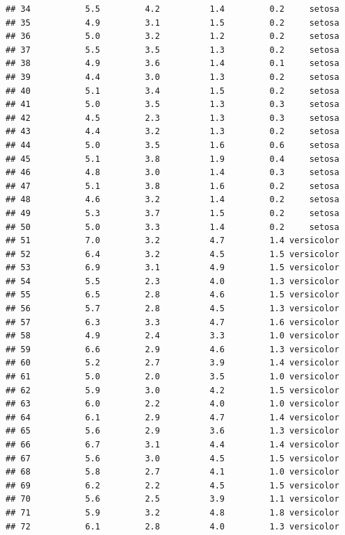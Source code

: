 \documentclass[
]{article}
\begin{document}
\begin{verbatim}
## 34           5.5         4.2          1.4         0.2     setosa
## 35           4.9         3.1          1.5         0.2     setosa
## 36           5.0         3.2          1.2         0.2     setosa
## 37           5.5         3.5          1.3         0.2     setosa
## 38           4.9         3.6          1.4         0.1     setosa
## 39           4.4         3.0          1.3         0.2     setosa
## 40           5.1         3.4          1.5         0.2     setosa
## 41           5.0         3.5          1.3         0.3     setosa
## 42           4.5         2.3          1.3         0.3     setosa
## 43           4.4         3.2          1.3         0.2     setosa
## 44           5.0         3.5          1.6         0.6     setosa
## 45           5.1         3.8          1.9         0.4     setosa
## 46           4.8         3.0          1.4         0.3     setosa
## 47           5.1         3.8          1.6         0.2     setosa
## 48           4.6         3.2          1.4         0.2     setosa
## 49           5.3         3.7          1.5         0.2     setosa
## 50           5.0         3.3          1.4         0.2     setosa
## 51           7.0         3.2          4.7         1.4 versicolor
## 52           6.4         3.2          4.5         1.5 versicolor
## 53           6.9         3.1          4.9         1.5 versicolor
## 54           5.5         2.3          4.0         1.3 versicolor
## 55           6.5         2.8          4.6         1.5 versicolor
## 56           5.7         2.8          4.5         1.3 versicolor
## 57           6.3         3.3          4.7         1.6 versicolor
## 58           4.9         2.4          3.3         1.0 versicolor
## 59           6.6         2.9          4.6         1.3 versicolor
## 60           5.2         2.7          3.9         1.4 versicolor
## 61           5.0         2.0          3.5         1.0 versicolor
## 62           5.9         3.0          4.2         1.5 versicolor
## 63           6.0         2.2          4.0         1.0 versicolor
## 64           6.1         2.9          4.7         1.4 versicolor
## 65           5.6         2.9          3.6         1.3 versicolor
## 66           6.7         3.1          4.4         1.4 versicolor
## 67           5.6         3.0          4.5         1.5 versicolor
## 68           5.8         2.7          4.1         1.0 versicolor
## 69           6.2         2.2          4.5         1.5 versicolor
## 70           5.6         2.5          3.9         1.1 versicolor
## 71           5.9         3.2          4.8         1.8 versicolor
## 72           6.1         2.8          4.0         1.3 versicolor

\end{verbatim}
\end{document}

